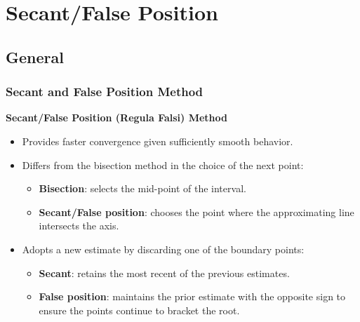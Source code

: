 \section{Secant/False Position}
\subsection*{General}
\begin{frame}[fragile]
  \frametitle{Secant and False Position Method}

  \textbf{Secant/False Position (Regula Falsi) Method}
  \begin{itemize}
    \item Provides faster convergence given sufficiently smooth behavior.
    \item Differs from the bisection method in the choice of the next point:
          \begin{itemize}
            \item \textbf{Bisection}: selects the mid-point of the interval.
            \item \textbf{Secant/False position}: chooses the point where the approximating line intersects the axis.
          \end{itemize}
    \item Adopts a new estimate by discarding one of the boundary points:
          \begin{itemize}
            \item \textbf{Secant}: retains the most recent of the previous estimates.
            \item \textbf{False position}: maintains the prior estimate with the opposite sign to ensure the points continue to bracket the root.
          \end{itemize}
  \end{itemize}
\end{frame}

